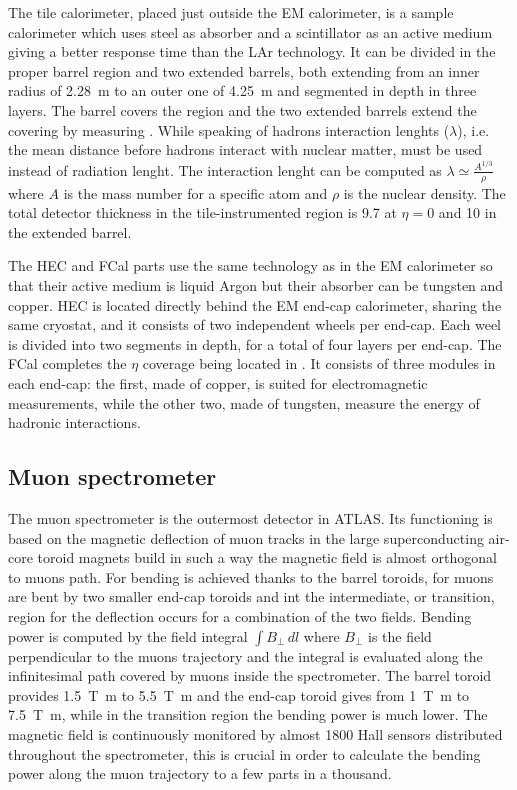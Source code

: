 The tile calorimeter, placed just outside the EM calorimeter, is a sample calorimeter which uses steel as absorber and a scintillator as an active medium giving a better response time than the LAr technology. It can be divided in the proper barrel region and two extended barrels, both extending from an inner radius of \SI{2.28}{\m} to an outer one of \SI{4.25}{\m} and segmented in depth in three layers. The barrel covers the region  and the two extended barrels extend the covering by measuring . While speaking of hadrons interaction lenghts ($\lambda$), i.e. the mean distance before hadrons interact with nuclear matter, must be used instead of radiation lenght. The interaction lenght can be computed as $\lambda \simeq \frac{A^{1/3}}{\rho}$ where $A$ is the mass number for a specific atom and $\rho$ is the nuclear density. The total detector thickness in the tile-instrumented region is \SI{9.7}{\lambda} at $\eta = 0$ and \SI{10}{\lambda} in the extended barrel.

The HEC and FCal parts use the same technology as in the EM calorimeter so that their active medium is liquid Argon but their absorber can be tungsten and copper. HEC is located directly behind the EM end-cap calorimeter, sharing the same cryostat, and it consists of two independent wheels per end-cap. Each weel is divided into two segments in depth, for a total of four layers per end-cap. The FCal completes the $\eta$ coverage being located in . It consists of three modules in each end-cap: the first, made of copper, is suited for electromagnetic measurements, while the other two, made of tungsten, measure the energy of hadronic interactions.

\subsection{Muon spectrometer}
\label{sec:muons}
The muon spectrometer is the outermost detector in ATLAS. Its functioning is based on the magnetic deflection of muon tracks in the large superconducting air-core toroid magnets build in such a way the magnetic field is almost orthogonal to muons path. For  bending is achieved thanks to the barrel toroids, for  muons are bent by two smaller end-cap toroids and int the intermediate, or transition, region for  the deflection occurs for a combination of the two fields. Bending power is computed by the field integral $\int B_{\bot}\,dl$ where $B_{\bot}$ is the field perpendicular to the muons trajectory and the integral is evaluated along the infinitesimal path covered by muons inside the spectrometer. The barrel toroid provides \SI{1.5}{\tesla \metre} to \SI{5.5}{\tesla \metre} and the end-cap toroid gives from \SI{1}{\tesla \metre} to \SI{7.5}{\tesla \metre}, while in the transition region the bending power is much lower. The magnetic field is continuously monitored by almost 1800 Hall sensors distributed throughout the spectrometer, this is crucial in order to calculate the bending power along the muon trajectory to a few parts in a thousand.

